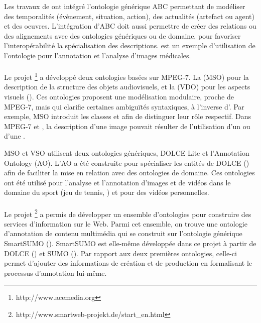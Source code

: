 Les travaux de \cite{Hunter2001} ont intégré l'ontologie générique ABC permettant de modéliser des temporalités (évènement, situation, action), des actualités (artefact ou agent) et des oeuvres.
L'intégration d'ABC doit aussi permettre de créer des relations ou des alignements avec des ontologies génériques ou de domaine, pour favoriser l'interopérabilité la spécialisation des descriptions. 
\cite{Hunter2004} est un exemple d'utilisation de l'ontologie pour l'annotation et l'analyse d'images médicales. 


\paragraph{}
Le projet \footnote{http://www.acemedia.org} a développé deux ontologies basées sur MPEG-7. 
La  (MSO) pour la description de la structure des objets audiovisuels, et la  (VDO) pour les aspects visuels (\cite{Petridis2004, Martinez2002}).
Ces ontologies proposent une modélisation modulaire, proche de MPEG-7, mais qui clarifie certaines ambiguïtés syntaxiques, à l'inverse d'.
Par exemple, MSO introduit les classes  et  afin de distinguer leur rôle respectif. 
Dans MPEG-7 et , la description d'une image pouvait résulter de l'utilisation d'un  ou d'une .

MSO et VSO utilisent deux ontologies génériques, DOLCE Lite et l'Annotation Ontology (AO).
L'AO a été construite pour spécialiser les entités de DOLCE (\cite{Borgo2002}) afin de faciliter la mise en relation avec des ontologies de domaine.
Ces ontologies ont été utilisé pour l'analyse et l'annotation d'images et de vidéos dans le domaine du sport (jeu de tennis, \cite{Petridis2006}) et pour des vidéos personnelles.


\paragraph{}
Le projet \footnote{http://www.smartweb-projekt.de/start\_en.html} a permis de développer un ensemble d'ontologies pour construire des services d'in\-fo\-rmation sur le Web. 
Parmi cet ensemble, on trouve une ontologie d'annotation de contenu multimédia qui se construit sur l'ontologie générique SmartSUMO (\cite{Oberle2007, Vembu2006}).
SmartSUMO est elle-même développée dans ce projet à partir de DOLCE (\cite{Borgo2002}) et SUMO (\cite{Niles2001}). 
Par rapport aux deux premières ontologies, celle-ci permet d'ajouter des informations de création et de production en formalisant le processus d'annotation lui-même.

